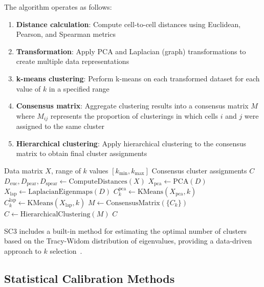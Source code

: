The algorithm operates as follows:
\begin{enumerate}[noitemsep]
    \item \textbf{Distance calculation}: Compute cell-to-cell distances using Euclidean, Pearson, and Spearman metrics
    \item \textbf{Transformation}: Apply PCA and Laplacian (graph) transformations to create multiple data representations
    \item \textbf{k-means clustering}: Perform k-means on each transformed dataset for each value of $k$ in a specified range
    \item \textbf{Consensus matrix}: Aggregate clustering results into a consensus matrix $M$ where $M_{ij}$ represents the proportion of clusterings in which cells $i$ and $j$ were assigned to the same cluster
    \item \textbf{Hierarchical clustering}: Apply hierarchical clustering to the consensus matrix to obtain final cluster assignments
\end{enumerate}

\begin{algorithm}[htbp]
\caption{SC3: Single-Cell Consensus Clustering}
\label{alg:sc3}
\begin{algorithmic}[1]
\Require Data matrix $X$, range of $k$ values $[k_{\min}, k_{\max}]$
\Ensure Consensus cluster assignments $C$
\State $D_{\text{euc}}, D_{\text{pear}}, D_{\text{spear}} \gets \text{ComputeDistances}(X)$ 
    \State $X_{\text{pca}} \gets \text{PCA}(D)$
    \State $X_{\text{lap}} \gets \text{LaplacianEigenmaps}(D)$
        \State $C_k^{\text{pca}} \gets \text{KMeans}(X_{\text{pca}}, k)$
        \State $C_k^{\text{lap}} \gets \text{KMeans}(X_{\text{lap}}, k)$
    \EndFor
\EndFor
\State $M \gets \text{ConsensusMatrix}(\{C_k\})$ 
\State $C \gets \text{HierarchicalClustering}(M)$
\State \Return $C$
\end{algorithmic}
\end{algorithm}

SC3 includes a built-in method for estimating the optimal number of clusters based on the Tracy-Widom distribution of eigenvalues, providing a data-driven approach to $k$ selection~\cite{kiselev2017sc3}.

\subsection{Statistical Calibration Methods}

